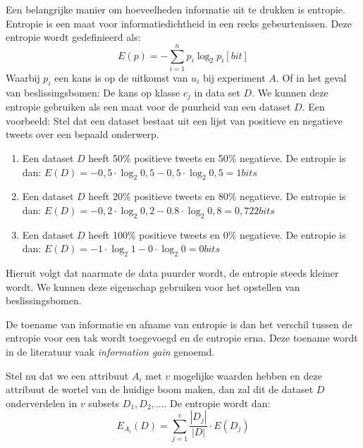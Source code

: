 Een belangrijke manier om hoeveelheden informatie uit te drukken is entropie. Entropie is een maat voor informatiedichtheid in een reeks gebeurtenissen. Deze entropie wordt gedefinieerd als:
\begin{equation}
E(p) = - \sum_{i=1}^{n} p_i \log_{2}{p_i} [bit]
\end{equation}
Waarbij $p_i$ een kans is op de uitkomst van $u_i$ bij experiment $A$. Of in het geval van beslissingsbomen: De kans op klasse $c_j$ in data set $D$. We kunnen deze entropie gebruiken als een maat voor de puurheid van een dataset $D$. Een voorbeeld: Stel dat een dataset bestaat uit een lijst van positieve en negatieve tweets over een bepaald onderwerp.
\begin{enumerate}
\item Een dataset $D$ heeft 50\% positieve tweets en 50\% negatieve. De entropie is dan: $E(D) = -0,5\cdot \log_2{0,5} - 0,5\cdot \log_{2}{0,5} = 1 bits$
\item Een dataset $D$ heeft 20\% positieve tweets en 80\% negatieve. De entropie is dan: $E(D) = -0,2\cdot \log_2{0,2} - 0.8\cdot \log_{2}{0,8} = 0,722 bits$
\item Een dataset $D$ heeft 100\% positieve tweets en 0\% negatieve. De entropie is dan: $E(D) = -1\cdot \log_2{1} - 0\cdot \log_{2}{0} = 0 bits$
\end{enumerate}

Hieruit volgt dat naarmate de data puurder wordt, de entropie steeds kleiner wordt. We kunnen deze eigenschap gebruiken voor het opstellen van beslissingsbomen.

De toename van informatie en afname van entropie is dan het verschil tussen de entropie voor een tak wordt toegevoegd en de entropie erna. Deze toename wordt in de literatuur vaak \emph{information gain} genoemd.

Stel nu dat we een attribuut $A_i$ met $v$ mogelijke waarden hebben en deze attribuut de wortel van de huidige boom maken, dan zal dit de dataset $D$ onderverdelen in $v$ subsets $D_1, D_2, ...$. De entropie wordt dan:
\begin{equation}
E_{A_i}(D) = \sum_{j=1}^{v} \frac{|{D_j}|}{|D|} \cdot E(D_j)
\end{equation}

